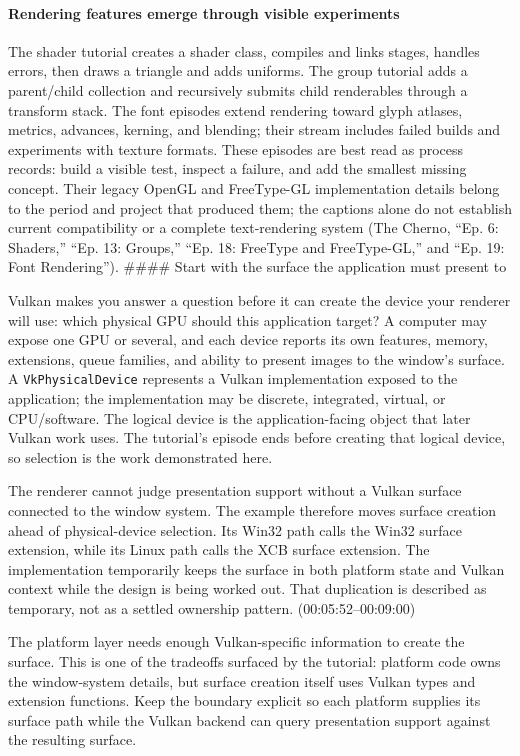 \paragraph{Rendering features emerge through visible experiments}\label{rendering-features-emerge-through-visible-experiments}

The shader tutorial creates a shader class, compiles and links stages, handles errors, then draws a triangle and adds uniforms. The group tutorial adds a parent/child collection and recursively submits child renderables through a transform stack. The font episodes extend rendering toward glyph atlases, metrics, advances, kerning, and blending; their stream includes failed builds and experiments with texture formats. These episodes are best read as process records: build a visible test, inspect a failure, and add the smallest missing concept. Their legacy OpenGL and FreeType-GL implementation details belong to the period and project that produced them; the captions alone do not establish current compatibility or a complete text-rendering system (The Cherno, ``Ep. 6: Shaders,'' ``Ep. 13: Groups,'' ``Ep. 18: FreeType and FreeType-GL,'' and ``Ep. 19: Font Rendering''). \#\#\#\# Start with the surface the application must present to

Vulkan makes you answer a question before it can create the device your renderer will use: which physical GPU should this application target? A computer may expose one GPU or several, and each device reports its own features, memory, extensions, queue families, and ability to present images to the window's surface. A \texttt{VkPhysicalDevice} represents a Vulkan implementation exposed to the application; the implementation may be discrete, integrated, virtual, or CPU/software. The logical device is the application-facing object that later Vulkan work uses. The tutorial's episode ends before creating that logical device, so selection is the work demonstrated here.

The renderer cannot judge presentation support without a Vulkan surface connected to the window system. The example therefore moves surface creation ahead of physical-device selection. Its Win32 path calls the Win32 surface extension, while its Linux path calls the XCB surface extension. The implementation temporarily keeps the surface in both platform state and Vulkan context while the design is being worked out. That duplication is described as temporary, not as a settled ownership pattern. (00:05:52--00:09:00)

The platform layer needs enough Vulkan-specific information to create the surface. This is one of the tradeoffs surfaced by the tutorial: platform code owns the window-system details, but surface creation itself uses Vulkan types and extension functions. Keep the boundary explicit so each platform supplies its surface path while the Vulkan backend can query presentation support against the resulting surface.


